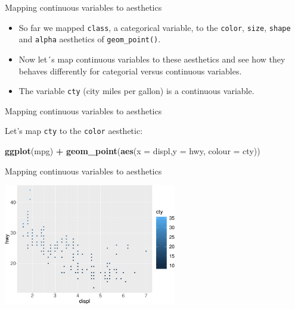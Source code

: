 \documentclass[ignorenonframetext,]{beamer}
\newenvironment{Shaded}{\begin{snugshade}}{\end{snugshade}}
\newcommand{\DataTypeTok}[1]{\textcolor[rgb]{0.13,0.29,0.53}{#1}}
\newcommand{\KeywordTok}[1]{\textcolor[rgb]{0.13,0.29,0.53}{\textbf{#1}}}
\newcommand{\NormalTok}[1]{#1}
\newcommand{\OperatorTok}[1]{\textcolor[rgb]{0.81,0.36,0.00}{\textbf{#1}}}
\newcommand{\StringTok}[1]{\textcolor[rgb]{0.31,0.60,0.02}{#1}}
\begin{document}
\begin{frame}[fragile]{Mapping continuous variables to aesthetics}
\protect\hypertarget{mapping-continuous-variables-to-aesthetics}{}

\begin{itemize}
\item
  So far we mapped \texttt{class}, a categorical variable, to the
  \texttt{color}, \texttt{size}, \texttt{shape} and \texttt{alpha}
  aesthetics of \texttt{geom\_point()}.
\item
  Now let´s map continuous variables to these aesthetics and see how
  they behaves differently for categorial versus continuous variables.
\item
  The variable \texttt{cty} (city miles per gallon) is a continuous
  variable.
\end{itemize}

\end{frame}

\begin{frame}[fragile]{Mapping continuous variables to aesthetics}
\protect\hypertarget{mapping-continuous-variables-to-aesthetics-1}{}

Let's map \texttt{cty} to the \texttt{color} aesthetic:

\begin{Shaded}
\begin{Highlighting}[]
\KeywordTok{ggplot}\NormalTok{(mpg) }\OperatorTok{+}
\StringTok{  }\KeywordTok{geom_point}\NormalTok{(}\KeywordTok{aes}\NormalTok{(}\DataTypeTok{x =}\NormalTok{ displ,}\DataTypeTok{y =}\NormalTok{ hwy, }\DataTypeTok{colour =}\NormalTok{ cty))}
\end{Highlighting}
\end{Shaded}

\end{frame}

\begin{frame}{Mapping continuous variables to aesthetics}
\protect\hypertarget{mapping-continuous-variables-to-aesthetics-2}{}

\begin{center}\includegraphics[height=200px]{data-visualization_files/figure-beamer/unnamed-chunk-22-1} \end{center}

\end{frame}
\end{document}
